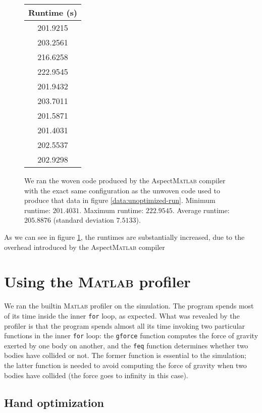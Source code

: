 \documentclass[11pt,letterpaper]{article}
\newcommand{\matlab}{\textsc{Matlab}}
\begin{document}
\begin{figure}[ht]
    \centering
    \begin{tabular}{|c|}
        \hline
        \textbf{Runtime (s)} \\ \hline \hline
        201.9215 \\
        203.2561 \\
        216.6258 \\
        222.9545 \\
        201.9432 \\
        203.7011 \\
        201.5871 \\
        201.4031 \\
        202.5537 \\
        202.9298 \\ \hline
    \end{tabular}

    \caption{
        We ran the woven code produced by the Aspect\matlab{} compiler with the
        exact same configuration as the unwoven code used to produce that data
        in figure \ref{data:unoptimized-run}.
        Minimum runtime: $201.4031$.
        Maximum runtime: $222.9545$.
        Average runtime: $205.8876$ (standard deviation $7.5133$).
    }
    \label{fig:wovenrun}
\end{figure}

As we can see in figure \ref{fig:wovenrun}, the runtimes are substantially
increased, due to the overhead introduced by the Aspect\matlab{} compiler

\section{Using the \matlab{} profiler}

We ran the builtin \matlab{} profiler on the simulation. The program spends most
of its time inside the inner \texttt{for} loop, as expected. What was revealed
by the profiler is that the program spends almost all its time invoking two
particular functions in the inner \texttt{for} loop: the \texttt{gforce}
function computes the force of gravity exerted by one body on another, and the
\texttt{feq} function determines whether two bodies have collided or not. The
former function is essential to the simulation; the latter function is needed
to avoid computing the force of gravity when two bodies have collided (the
force goes to infinity in this case).

\subsection{Hand optimization}
\end{document}
